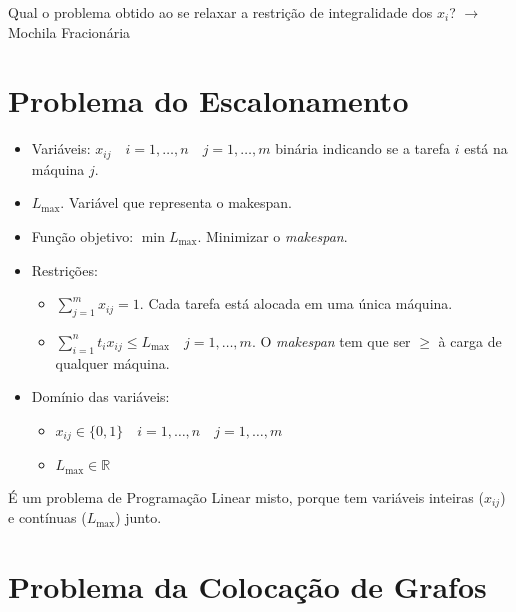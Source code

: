 Qual o problema obtido ao se relaxar a restrição de integralidade dos $x_i$? $\to$ Mochila Fracionária

\section{Problema do Escalonamento}

\begin{itemize}
    \item Variáveis: $x_{ij} \quad i = 1,\dots,n \quad j=1,\dots,m$ binária indicando se a tarefa $i$ está na máquina $j$.
    \item $L_{\max}$. Variável que representa o makespan.
    \item Função objetivo: $\min L_{\max}$. Minimizar o \textit{makespan}.
    \item Restrições:
    \begin{itemize}
        \item $\sum_{j=1}^mx_{ij}=1$. Cada tarefa está alocada em uma única máquina.
        \item $\sum_{i=1}^nt_ix_{ij}\leq L_{\max} \quad j=1,\dots,m$. O \textit{makespan} tem que ser $\geq$ à carga de qualquer máquina.
    \end{itemize}
    \item Domínio das variáveis:
    \begin{itemize}
        \item $x_{ij} \in \{0,1\} \quad i=1,\dots,n \quad j=1,\dots,m$
        \item $L_{\max} \in \mathbb{R}$
    \end{itemize}
\end{itemize}

É um problema de Programação Linear misto, porque tem variáveis inteiras ($x_{ij}$) e contínuas ($L_{\max}$) junto.

\section{Problema da Colocação de Grafos}

